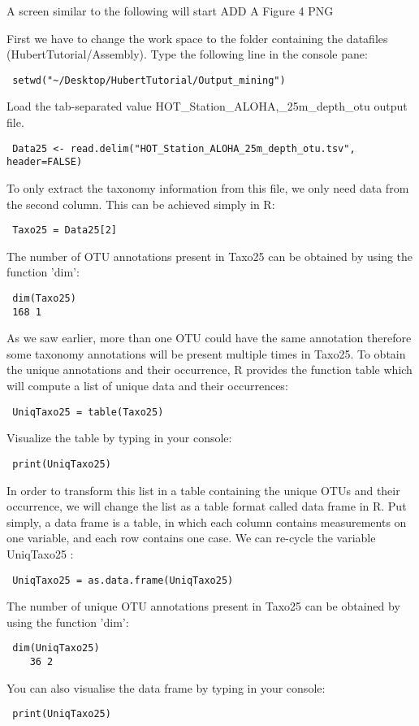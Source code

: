 \documentclass[a4paper,12pt,twoside]{memoir}
\begin{document}
\begin{note}
A screen similar to the following will start
ADD A Figure 4  PNG
\end{note}

\begin{steps}
First we have to change the work space to the folder containing the datafiles (HubertTutorial/Assembly). Type the following line in the console pane:
\begin{lstlisting}
 setwd("~/Desktop/HubertTutorial/Output_mining")
\end{lstlisting}
Load the tab-separated value HOT\_Station\_ALOHA,\_25m\_depth\_otu output file. 
\begin{lstlisting}
 Data25 <- read.delim("HOT_Station_ALOHA_25m_depth_otu.tsv", header=FALSE)
\end{lstlisting}
To only extract the taxonomy information from this file, we only need data from the second column. This can be achieved simply in R:
\begin{lstlisting}
 Taxo25 = Data25[2]
\end{lstlisting}
The number of OTU annotations present in Taxo25 can be obtained by using the function 'dim':
\begin{lstlisting}
 dim(Taxo25)
 168 1
\end{lstlisting}
As we saw earlier, more than one OTU could have the same annotation therefore some taxonomy annotations will be present multiple times in Taxo25. To obtain the unique annotations and their occurrence, R provides the function table which will compute a list of unique data and their occurrences:
\begin{lstlisting}
 UniqTaxo25 = table(Taxo25)
\end{lstlisting}
Visualize the table by typing in your console:
\begin{lstlisting}
 print(UniqTaxo25)
\end{lstlisting}
\end{steps}

\begin{steps}
In order to transform this list in a table containing the unique OTUs and their occurrence, we will change the list as a table format called data frame in R.
Put simply, a data frame is a table, in which each column contains measurements on one variable, and each row contains one case.
  We can re-cycle the variable UniqTaxo25 :
\begin{lstlisting}
 UniqTaxo25 = as.data.frame(UniqTaxo25)
\end{lstlisting}
The number of unique OTU annotations present in Taxo25 can be obtained by using the function 'dim':
\begin{lstlisting}
 dim(UniqTaxo25)
    36 2
\end{lstlisting}
You can also visualise the data frame by typing in your console:
\begin{lstlisting} 
 print(UniqTaxo25)
\end{lstlisting}
\end{steps}
\end{document}

